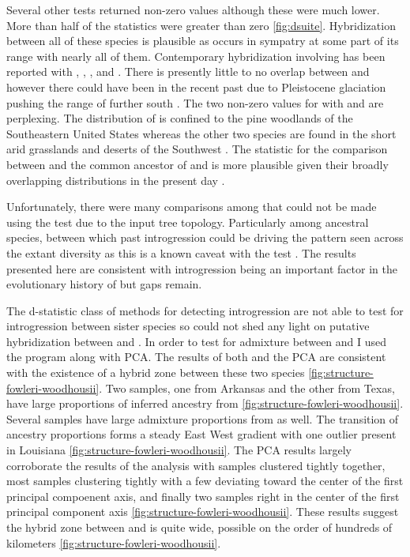 Several other \fbranch tests returned non-zero values although these were much
lower.
More than half of the \wood \fbranch statistics were greater than zero \amer \cref{fig:dsuite}.
Hybridization between all of these species is plausible as \wood occurs in 
sympatry at some part of its range with nearly all of them. 
Contemporary hybridization involving \wood has been reported with \amer, 
\cognatus, \microscaphus, and \speciosus \parencite{sullivan1986}. 
There is presently little to no overlap between \wood and \hemiophrys however
there could have been in the recent past due to Pleistocene glaciation  
pushing the range of \hemiophrys further south \parencite{henrich1968}. 
The two non-zero \fbranch values for \quercicus with \punctatus and \speciosus 
are perplexing.  
The distribution of \quercicus is confined to the pine woodlands of the 
Southeastern United States whereas the other two species are found in the  
short arid grasslands and deserts of the Southwest \parencite{conant1998}. 
The \fbranch statistic for the comparison between \punctatus and the common 
ancestor of \speciosus and \cognatus is more plausible given their broadly
overlapping distributions in the present day \parencite{conant1998}.

Unfortunately, there were many comparisons among \anaxyrus that could not be 
made using the \fbranch test due to the input tree topology. 
Particularly among ancestral species, between which past introgression could
be driving the pattern seen across the extant diversity as this is a known 
caveat with the \fbranch test \parencite{malinsky2021}.
The results presented here are consistent with introgression being an 
important factor in the evolutionary history of \anaxyrus but gaps remain.

The d-statistic class of methods for detecting introgression are not able to   
test for introgression between sister species so could not shed any light 
on putative hybridization between \fowl and \wood \parencite{meacham1962}. 
In order to test for admixture between \fowl and \wood I used the program 
\structure along with PCA.  
The results of both \structure and the PCA are consistent with the existence of  
a hybrid zone between these two species \cref{fig:structure-fowleri-woodhousii}.
Two \wood samples, one from Arkansas and the other from Texas, have large proportions 
of inferred ancestry from \fowl \cref{fig:structure-fowleri-woodhousii}. 
Several \fowl samples have large admixture proportions from \wood as well.  
The transition of ancestry proportions forms a steady East West gradient with 
one outlier present in Louisiana \cref{fig:structure-fowleri-woodhousii}.
The PCA results largely corroborate the results of the \structure analysis with 
\wood samples clustered tightly together, most \fowl samples clustering tightly
with a few deviating toward the center of the first principal compoenent axis, 
and finally two samples right in the center of the first principal component axis
\cref{fig:structure-fowleri-woodhousii}.
These results suggest the hybrid zone between \fowl and \wood is quite wide, 
possible on the order of hundreds of kilometers \cref{fig:structure-fowleri-woodhousii}.

